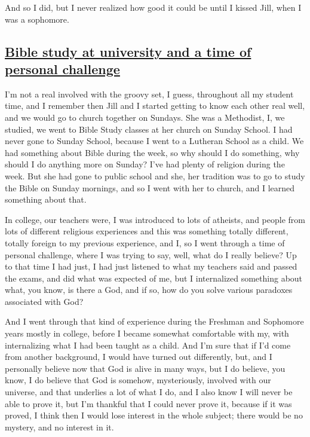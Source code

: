 \documentclass[]{article}
\begin{document}
And so I did, but I never realized how good it could be until I kissed
Jill, when I was a sophomore.

\subsection{\texorpdfstring{\href{http://webofstories.com/play/17073}{Bible
study at university and a time of personal
challenge}}{Bible study at university and a time of personal challenge}}\label{bible-study-at-university-and-a-time-of-personal-challenge}

I'm not a real involved with the groovy set, I guess, throughout all my
student time, and I remember then Jill and I started getting to know
each other real well, and we would go to church together on Sundays. She
was a Methodist, I, we studied, we went to Bible Study classes at her
church on Sunday School. I had never gone to Sunday School, because I
went to a Lutheran School as a child. We had something about Bible
during the week, so why should I do something, why should I do anything
more on Sunday? I've had plenty of religion during the week. But she had
gone to public school and she, her tradition was to go to study the
Bible on Sunday mornings, and so I went with her to church, and I
learned something about that.

In college, our teachers were, I was introduced to lots of atheists, and
people from lots of different religious experiences and this was
something totally different, totally foreign to my previous experience,
and I, so I went through a time of personal challenge, where I was
trying to say, well, what do I really believe? Up to that time I had
just, I had just listened to what my teachers said and passed the exams,
and did what was expected of me, but I internalized something about
what, you know, is there a God, and if so, how do you solve various
paradoxes associated with God?

And I went through that kind of experience during the Freshman and
Sophomore years mostly in college, before I became somewhat comfortable
with my, with internalizing what I had been taught as a child. And I'm
sure that if I'd come from another background, I would have turned out
differently, but, and I personally believe now that God is alive in many
ways, but I do believe, you know, I do believe that God is somehow,
mysteriously, involved with our universe, and that underlies a lot of
what I do, and I also know I will never be able to prove it, but I'm
thankful that I could never prove it, because if it was proved, I think
then I would lose interest in the whole subject; there would be no
mystery, and no interest in it.
\end{document}
